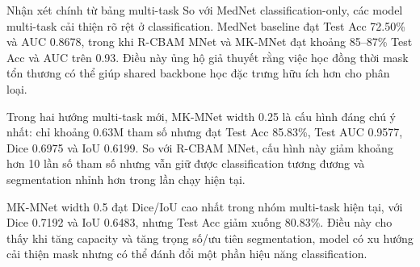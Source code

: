 \documentclass[12pt,a4paper]{article}
\begin{document}
\begin{table}[H]
\centering
\caption{Kết quả các model multi-task chính trong repo}
\renewcommand{\arraystretch}{1.25}
\end{table}

\begin{methodbox}{Nhận xét chính từ bảng multi-task}
So với MedNet classification-only, các model multi-task cải thiện rõ rệt ở classification. MedNet baseline đạt Test Acc 72.50\% và AUC 0.8678, trong khi R-CBAM MNet và MK-MNet đạt khoảng 85--87\% Test Acc và AUC trên 0.93. Điều này ủng hộ giả thuyết rằng việc học đồng thời mask tổn thương có thể giúp shared backbone học đặc trưng hữu ích hơn cho phân loại.
\end{methodbox}

Trong hai hướng multi-task mới, MK-MNet width 0.25 là cấu hình đáng chú ý nhất: chỉ khoảng 0.63M tham số nhưng đạt Test Acc 85.83\%, Test AUC 0.9577, Dice 0.6975 và IoU 0.6199. So với R-CBAM MNet, cấu hình này giảm khoảng hơn 10 lần số tham số nhưng vẫn giữ được classification tương đương và segmentation nhỉnh hơn trong lần chạy hiện tại.

MK-MNet width 0.5 đạt Dice/IoU cao nhất trong nhóm multi-task hiện tại, với Dice 0.7192 và IoU 0.6483, nhưng Test Acc giảm xuống 80.83\%. Điều này cho thấy khi tăng capacity và tăng trọng số/ưu tiên segmentation, model có xu hướng cải thiện mask nhưng có thể đánh đổi một phần hiệu năng classification.
\end{document}
